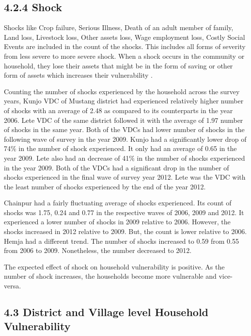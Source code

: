 \documentclass[12pt, a4paper]{article}
\begin{document}
\subsection*{4.2.4 Shock}
Shocks like Crop failure, Serious Illness, Death of an adult member of family, Land loss, Livestock loss, Other assets loss, Wage employment loss, Costly Social Events are included in the count of the shocks. This includes all forms of severity from less severe to more severe shock. When a shock occurs in the community or household, they lose their assets that might be in the form of saving or other form of assets which increases their vulnerability \citep{dercon2006vulnerability}. 

Counting the number of shocks experienced by the household across the survey years, Kunjo VDC of Mustang district had experienced relatively higher number of shocks with an average of 2.48 as compared to its counterparts in the year 2006. Lete VDC of the same district followed it with the average of 1.97 number of shocks in the same year. Both of the VDCs had lower number of shocks in the following wave of survey in the year 2009. Kunjo had a significantly lower drop of 74\% in the number of shock experienced. It only had an average of 0.65 in the year 2009. Lete also had an decrease of 41\% in the number of shocks experienced in the year 2009. Both of the VDCs had a significant drop in the number of shocks experienced in the final wave of survey year 2012. Lete was the VDC with the least number of shocks experienced by the end of the year 2012.

Chainpur  had a fairly fluctuating average of shocks experienced. Its count of shocks was 1.75, 0.24 and 0.77 in the respective waves of 2006, 2009 and 2012. It experienced a lower number of shocks in 2009 relative to 2006. However, the shocks increased in 2012 relative to 2009. But, the count is lower relative to 2006.
Hemja had a different trend. The number of shocks increased to 0.59 from 0.55 from 2006 to 2009. Nonetheless, the number decreased to 2012.
      
The expected effect of shock on household vulnerability is positive. As the number of shock increases, the households become more vulnerable and vice-versa.

\subsection*{4.3 District and Village level Household Vulnerability}
\renewcommand{\thepage}{\arabic{page}} 
 
\end{document}
